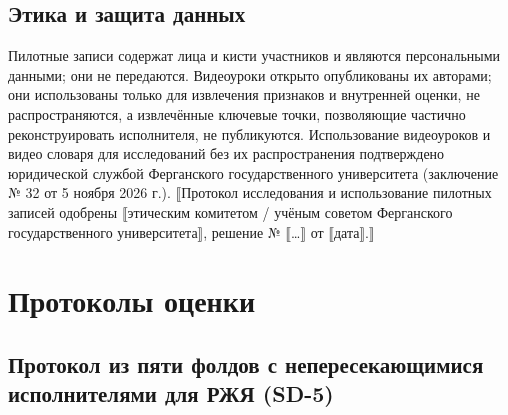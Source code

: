 \hypertarget{ux44dux442ux438ux43aux430-ux438-ux437ux430ux449ux438ux442ux430-ux434ux430ux43dux43dux44bux445}{%
\subsection{Этика и защита данных}\label{ux44dux442ux438ux43aux430-ux438-ux437ux430ux449ux438ux442ux430-ux434ux430ux43dux43dux44bux445}}

Пилотные записи содержат лица и кисти участников и являются персональными данными; они не передаются. Видеоуроки открыто опубликованы их авторами; они использованы только для извлечения признаков и внутренней оценки, не распространяются, а извлечённые ключевые точки, позволяющие частично реконструировать исполнителя, не публикуются. Использование видеоуроков и видео словаря для исследований без их распространения подтверждено юридической службой Ферганского государственного университета (заключение № 32 от 5 ноября 2026 г.). ⟦Протокол исследования и использование пилотных записей одобрены ⟦этическим комитетом / учёным советом Ферганского государственного университета⟧, решение № ⟦\ldots⟧ от ⟦дата⟧.⟧

\hypertarget{ux43fux440ux43eux442ux43eux43aux43eux43bux44b-ux43eux446ux435ux43dux43aux438}{%
\section{Протоколы оценки}\label{ux43fux440ux43eux442ux43eux43aux43eux43bux44b-ux43eux446ux435ux43dux43aux438}}

\hypertarget{ux43fux440ux43eux442ux43eux43aux43eux43b-ux438ux437-ux43fux44fux442ux438-ux444ux43eux43bux434ux43eux432-ux441-ux43dux435ux43fux435ux440ux435ux441ux435ux43aux430ux44eux449ux438ux43cux438ux441ux44f-ux438ux441ux43fux43eux43bux43dux438ux442ux435ux43bux44fux43cux438-ux434ux43bux44f-ux440ux436ux44f-sd-5}{%
\subsection{Протокол из пяти фолдов с непересекающимися исполнителями для РЖЯ (SD-5)}\label{ux43fux440ux43eux442ux43eux43aux43eux43b-ux438ux437-ux43fux44fux442ux438-ux444ux43eux43bux434ux43eux432-ux441-ux43dux435ux43fux435ux440ux435ux441ux435ux43aux430ux44eux449ux438ux43cux438ux441ux44f-ux438ux441ux43fux43eux43bux43dux438ux442ux435ux43bux44fux43cux438-ux434ux43bux44f-ux440ux436ux44f-sd-5}}

